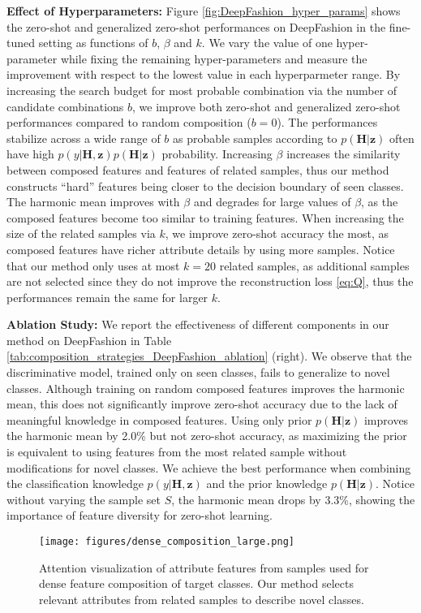 \documentclass[10pt,journal,compsoc]{IEEEtran}
\newcommand{\z}{\boldsymbol{z}}
\renewcommand{\H}{\boldsymbol{H}}
\newcommand{\1}{\boldsymbol{1}}
\newcommand{\0}{\boldsymbol{0}}
\newcommand{\<}{\langle}
\renewcommand{\>}{\rangle}
\newcommand{\myparagraph}[1]{\vspace{-2pt}\medskip\noindent\textbf{#1}}
\begin{document}
\myparagraph{Effect of Hyperparameters:}
Figure \ref{fig:DeepFashion_hyper_params} shows the zero-shot and generalized zero-shot performances on DeepFashion in the fine-tuned setting as functions of $b$, $\beta$ and $k$. We vary the value of one hyper-parameter while fixing the remaining hyper-parameters and measure the improvement with respect to the lowest value in each hyperparmeter range.
By increasing the search budget for most probable combination via the number of candidate combinations $b$, we improve both zero-shot and generalized zero-shot performances compared to random composition ($b=0$). 
The performances stabilize across a wide range of $b$ as probable samples according to $p(\H|\z)$ often have high $p(y|\H,\z)p(\H|\z)$ probability. Increasing $\beta$ increases the similarity between composed features and features of related samples, thus our method constructs ``hard'' features being closer to the decision boundary of seen classes. The harmonic mean improves with $\beta$ and degrades for large values of $\beta$, as the composed features become too similar to training features.
When increasing the size of the related samples via $k$, we improve zero-shot accuracy the most, as composed features have richer attribute details by using more samples. 
Notice that our method only uses at most $k=20$ related samples, as additional samples are not selected since they do not improve the reconstruction loss \eqref{eq:Q}, thus the performances remain the same for larger $k$.

\myparagraph{Ablation Study:}
We report the effectiveness of different components in our method on DeepFashion in Table \ref{tab:composition_strategies_DeepFashion_ablation} (right). We observe that the discriminative model, trained only on seen classes, fails to generalize to novel classes. 
Although training on random composed features improves the harmonic mean, this does not significantly improve zero-shot accuracy due to the lack of meaningful knowledge in composed features. Using only prior $p(\H|\z)$ improves the harmonic mean by 2.0\% but not zero-shot accuracy, as maximizing the prior is equivalent to using features from the most related sample without modifications for novel classes.
We achieve the best performance when combining the classification knowledge $p(y|\H,\z)$ and the prior knowledge $p(\H|\z)$.
Notice without varying the sample set $S$, the harmonic mean drops by 3.3\%, showing the importance of feature diversity for zero-shot learning.

\begin{figure*}[h]
\centering
\texttt{[image: figures/dense\_composition\_large.png]}
\vspace{-0mm}
\caption{
\small{Attention visualization of attribute features from samples used for dense feature composition of target classes. Our method selects relevant attributes from related samples to describe novel classes. 
}
}
\label{fig:dense_composition_samples}
\end{figure*}
\end{document}
